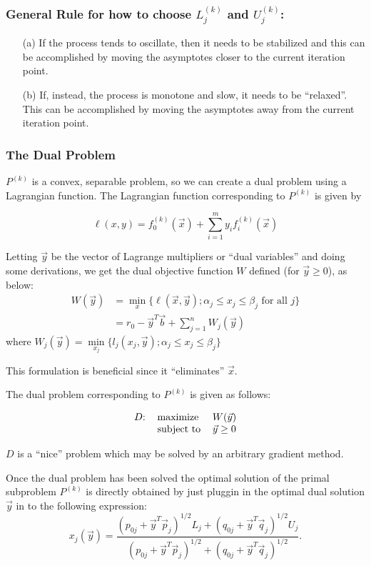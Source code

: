 \subsubsection*{General Rule for how to choose $L_j^{(k)}$ and $U_j^{(k)}$:}
\begin{itemize}
	\item[(a)] If the process tends to oscillate, then it needs to be stabilized and this can be accomplished by moving the asymptotes closer to the current iteration point.
	\item[(b)] If, instead, the process is monotone and slow, it needs to be ``relaxed''. This can be accomplished by moving the asymptotes away from the current iteration point.
\end{itemize}

\subsubsection*{The Dual Problem}

$P^{(k)}$ is a convex, separable problem, so we can create a dual problem using a Lagrangian function. The Lagrangian function corresponding to $P^{(k)}$ is given by 

$$\ell(x,y)=f_0^{(k)}(\vec{x})+\sum\limits_{i=1}^{m}y_if_i^{(k)}(\vec{x})$$

Letting $\vec{y}$ be the vector of Lagrange multipliers or ``dual variables'' and doing some derivations, we get the dual objective function $W$ defined (for $\vec{y}\geq 0$), as below:
\begin{align*}
	W(\vec{y}) & =\min\limits_x\lbrace\ell(\vec{x},\vec{y}); \alpha_j\leq x_j\leq \beta_j\text{ for all }j\rbrace \\
	           & =r_0-\vec{y}^T\vec{b}+\sum\limits_{j=1}^{n}W_j(\vec{y})                                          
\end{align*}
where $W_j(\vec{y})=\min\limits_{x_j}\lbrace l_j(x_j,\vec{y}); \alpha_j\leq x_j\leq \beta_j\rbrace$

This formulation is beneficial since it ``eliminates'' $\vec{x}$.

The dual problem corresponding to $P^{(k)}$ is given as follows:

\begin{equation}
	\begin{tabular}{lll}
		$D$: & maximize   & $W(\vec{y})$    \\
		     & subject to & $\vec{y}\geq 0$
	\end{tabular}
\end{equation}
                                     
$D$ is a ``nice'' problem which may be solved by an arbitrary gradient method.

Once the dual problem has been solved the optimal solution of the primal subproblem $P^{(k)}$ is directly obtained by just pluggin in the optimal dual solution $\vec{y}$ in to the following expression:
$$x_j(\vec{y})=\frac{\left(p_{0j}+\vec{y}^T\vec{p}_j\right)^{1/2}L_j+\left(q_{0j}+\vec{y}^T\vec{q}_j\right)^{1/2}U_j}{\left(p_{0j}+\vec{y}^T\vec{p}_j\right)^{1/2}+\left(q_{0j}+\vec{y}^T\vec{q}_j\right)^{1/2}}.$$
